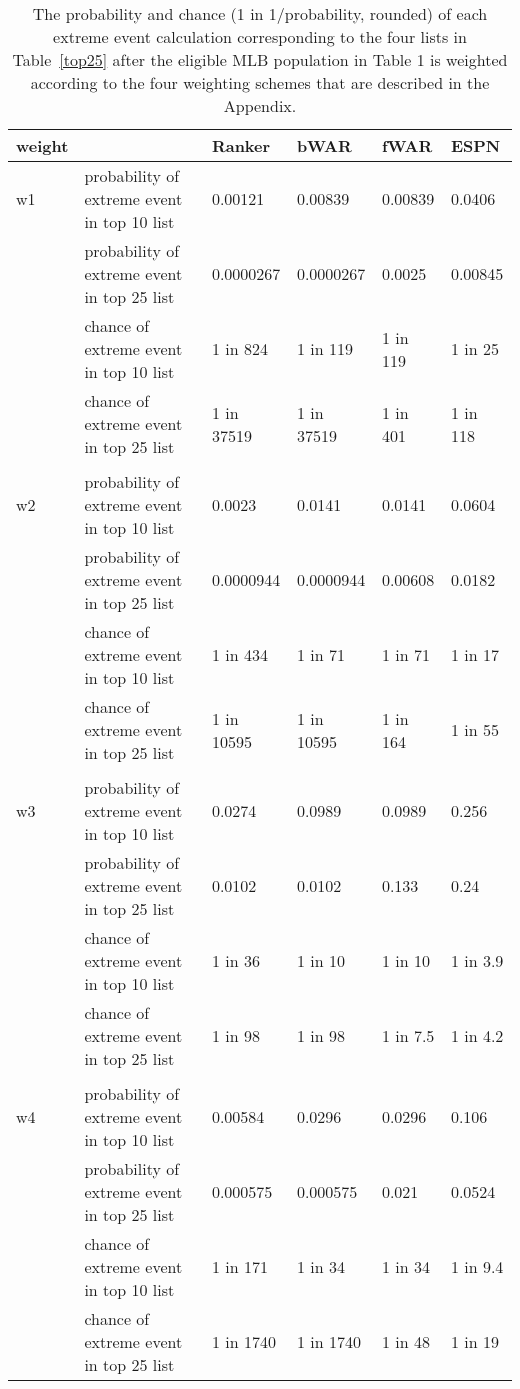 \documentclass[11pt]{article}\usepackage[]{graphicx}\usepackage[]{color}
\begin{document}
\begin{table}[h!]
\begin{center}
\begin{tabular}{llllll}
\hline
 weight & &  Ranker  &  bWAR  &  fWAR  &  ESPN \\
 \hline
w1 & probability of extreme event in top 10 list 
  & 0.00121 
  & 0.00839 
  & 0.00839 
  & 0.0406 \\
& probability of extreme event in top 25 list 
  & 0.0000267 
  & 0.0000267 
  & 0.0025 
  & 0.00845 \\
& chance of extreme event in top 10 list 
  & 1 in 824 
  & 1 in 119 
  & 1 in 119 
  & 1 in 25 \\
& chance of extreme event in top 25 list 
  & 1 in 37519 
  & 1 in 37519 
  & 1 in 401 
  & 1 in 118 \\
  & & & & & \\
w2 & probability of extreme event in top 10 list 
  & 0.0023 
  & 0.0141 
  & 0.0141 
  & 0.0604 \\
& probability of extreme event in top 25 list 
  & 0.0000944 
  & 0.0000944 
  & 0.00608 
  & 0.0182 \\
& chance of extreme event in top 10 list 
  & 1 in 434 
  & 1 in 71 
  & 1 in 71 
  & 1 in 17 \\
& chance of extreme event in top 25 list 
  & 1 in 10595 
  & 1 in 10595 
  & 1 in 164 
  & 1 in 55 \\
  & & & & & \\
w3 & probability of extreme event in top 10 list 
  & 0.0274 
  & 0.0989 
  & 0.0989 
  & 0.256 \\
& probability of extreme event in top 25 list 
  & 0.0102 
  & 0.0102 
  & 0.133 
  & 0.24 \\
& chance of extreme event in top 10 list 
  & 1 in 36 
  & 1 in 10 
  & 1 in 10 
  & 1 in 3.9 \\
& chance of extreme event in top 25 list 
  & 1 in 98 
  & 1 in 98 
  & 1 in 7.5 
  & 1 in 4.2 \\
  & & & & & \\  
w4 & probability of extreme event in top 10 list 
  & 0.00584 
  & 0.0296 
  & 0.0296 
  & 0.106 \\
& probability of extreme event in top 25 list 
  & 0.000575 
  & 0.000575 
  & 0.021 
  & 0.0524 \\
& chance of extreme event in top 10 list 
  & 1 in 171 
  & 1 in 34 
  & 1 in 34 
  & 1 in 9.4 \\
& chance of extreme event in top 25 list 
  & 1 in 1740 
  & 1 in 1740 
  & 1 in 48 
  & 1 in 19 \\
  \hline
\end{tabular}
\end{center}
\caption{The probability and chance (1 in 1/probability, rounded) 
  of each extreme event calculation corresponding to the four lists in 
  Table~\ref{top25} after the eligible MLB population in Table 1 is 
  weighted according to the four weighting schemes that are described in 
  the Appendix.}
\label{probvalues.weights}
\end{table}
\end{document}
